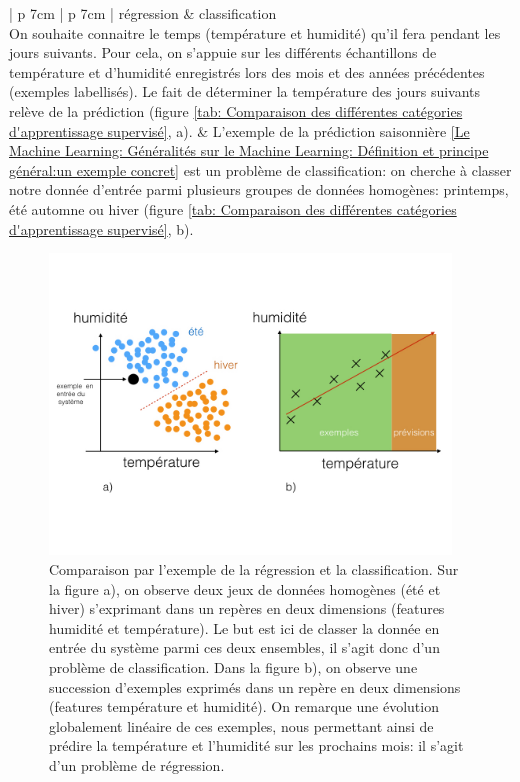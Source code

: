 \begin{table}[h]
	\begin{tabular}{ | p {7cm} | p {7cm} |}
		\hline
		régression & classification \\
		\hline
		On souhaite connaitre le temps (température et humidité) qu'il fera pendant les jours suivants. Pour cela, on s'appuie sur les différents échantillons de température et d'humidité enregistrés lors des mois et des années précédentes (exemples labellisés). Le fait de déterminer la température des jours suivants relève de la prédiction (figure \ref {tab: Comparaison des différentes catégories d'apprentissage supervisé}, a).  
		 &  L'exemple de la prédiction saisonnière \ref{Le Machine Learning: Généralités sur le Machine Learning: Définition et principe général:un exemple concret} est un problème de classification: on cherche à classer notre donnée d'entrée parmi plusieurs groupes de données homogènes: printemps, été automne ou hiver (figure \ref {tab: Comparaison des différentes catégories d'apprentissage supervisé}, b). \\
		\hline 
	\end{tabular}
	\caption[Comparaison des différentes catégories d'apprentissage supervisé]{Comparaison entre l'apprentissage supervisé de type régression et supervisé de type classification}
	\label {tab: Comparaison des différentes catégories d'apprentissage supervisé}
\end{table}

\begin{figure}[h]
	\centering\includegraphics[height=8cm]{images/regression_class.jpeg}
	\caption[Comparaison par l'exemple de la régression et la classification]{Comparaison par l'exemple de la régression et la classification. Sur la figure a), on observe deux jeux de données homogènes (été et hiver) s'exprimant dans un repères en deux dimensions (features humidité et température). Le but est ici de classer la donnée en entrée du système parmi ces deux ensembles, il s'agit donc d'un problème de classification. Dans la figure b), on observe une succession d'exemples exprimés dans un repère en deux dimensions (features température et humidité). On remarque une évolution globalement linéaire de ces exemples, nous permettant ainsi de prédire la température et l'humidité sur les prochains mois: il s'agit d'un problème de régression.}
	\label{fig:Comparaison par l'exemple de la régression et la classification}
\end{figure}

